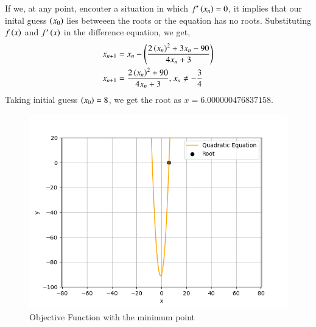 \documentclass[journal]{IEEEtran}
\begin{document}
If we, at any point, encouter a situation in which $f^{\prime}\left(x_n\right) = 0$, it implies that our inital guess $\left(x_0\right)$ lies betweeen the roots or the equation has no roots.
\newline
Substituting $f\left(x\right)$ and $f^{\prime}\left(x\right)$ in the difference equation, we get,
\begin{align}
    x_{n + 1} &= x_n - \left(\frac{2\left(x_n\right)^2 + 3x_n - 90}{4x_n + 3}\right)\\
    x_{n + 1} &= \frac{2\left(x_n\right)^2 + 90}{4x_n + 3} \text{, } x_n \neq -\frac{3}{4}
\end{align}
Taking initial guess $\left(x_0\right) = 8$, we get the root as $x = 6.000000476837158$.
\begin{figure}[h!]
   \centering
   \includegraphics[width=0.7\columnwidth]{figs/graph.png}
   \caption{Objective Function with the minimum point}
   \label{label}
\end{figure}
\end{document}
